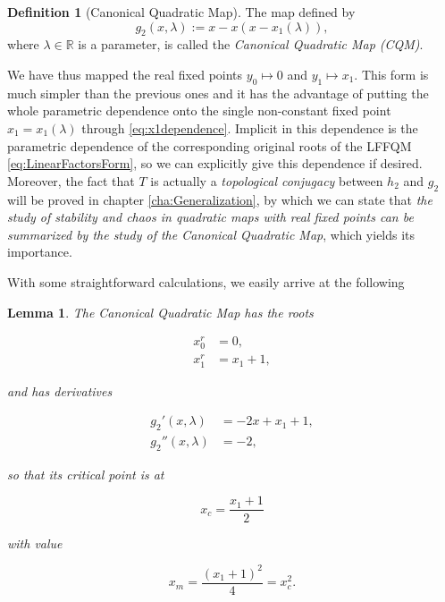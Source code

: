 \documentclass[10pt,twoside,titlepage]{book}
\numberwithin{equation}{chapter}
\numberwithin{figure}{chapter}
\numberwithin{table}{chapter}
\theoremstyle{plain}%
\newtheorem{lem}[thm]{Lemma}
\theoremstyle{definition}
\newtheorem{defn}{Definition}[chapter]
\theoremstyle{remark}
\begin{document}
\begin{defn}[Canonical Quadratic Map]
	\label{def:CQM}
	The map defined by
	\begin{equation}
		g_2(x,\lambda):=x-x(x-x_1(\lambda)),
	\end{equation}
	where $\lambda\in\mathbb{R}$ is a parameter, is called the \emph{Canonical Quadratic Map (CQM)}.
\end{defn}

We have thus mapped the real fixed points $y_0\mapsto 0$ and $y_1\mapsto x_1$. This form is much simpler than the previous ones and it has the advantage of putting the whole parametric dependence onto the single non-constant fixed point $x_1=x_1(\lambda)$ through \eqref{eq:x1dependence}. Implicit in this dependence is the parametric dependence of the corresponding original roots of the LFFQM \eqref{eq:LinearFactorsForm}, so we can explicitly give this dependence if desired. Moreover, the fact that $T$ is actually a \emph{topological conjugacy} between $h_2$ and $g_2$ will be proved in chapter \ref{cha:Generalization}, by which we can state that \emph{the study of stability and chaos in quadratic maps with real fixed points can be summarized by the study of the Canonical Quadratic Map}, which yields its importance.

With some straightforward calculations, we easily arrive at the following

\begin{lem}
	The Canonical Quadratic Map has the roots
	
	\begin{equation}
		\begin{aligned}
			x_0^r &= 0, \\
			x_1^r &= x_1+1,
		\end{aligned}
	\end{equation}
	
	and has derivatives
	
	\begin{equation}
		\begin{aligned}
			\label{eq:CQM-derivatives}
			g_2'(x,\lambda) &=-2x+x_1+1,\\
			g_2''(x,\lambda) &= -2,
		\end{aligned}
	\end{equation}
	
	so that its critical point is at
	
	\[x_c=\frac{x_1+1}{2}\]
	
	with value
	
	\begin{equation}
		x_m=\frac{(x_1+1)^2}{4}=x_c^2.
		\label{eq:CanonicalMaximum}
	\end{equation}
\end{lem}
\end{document}
